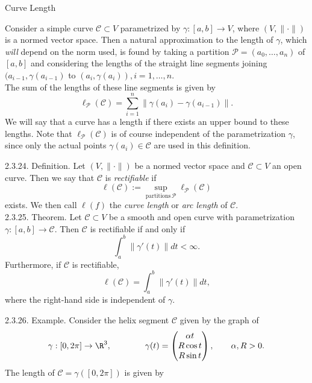 \documentclass[smaller,hyperref={CJKbookmarks=true}]{beamer}
\begin{document}
\begin{frame}{Curve Length}
\begin{spacing}{1.1}
Consider a simple curve $\mathcal{C}\subset V$ parametrized by $\gamma:[a,b]\to V$, where $(V,\|\cdot\|)$ is a normed vector space. Then a natural approximation to the length of $\gamma$, which \emph{will} depend on the norm used, is found by taking a partition $\mathcal{P}=(a_0,\ldots,a_n)$ of $[a,b]$ and considering the lengths of the straight line segments joining $(a_{i-1},\gamma(a_{i-1})$ to $(a_i,\gamma(a_i)),i=1,\ldots,n$.\\[4pt]
The sum of the lengths of these line segments is given by
\[\ell_\mathcal{P}(\mathcal{C})=\sum_{i=1}^{n}
\|\gamma(a_i)-\gamma(a_{i-1})\|.\]
We will say that a curve has a length if there exists an upper bound to
these lengths. Note that $\ell_\mathcal{P}(\mathcal{C})$ is of course independent of the parametrization $\gamma$, since only the actual points $\gamma(a_i)\in\mathcal{C}$ are used in this definition.
\end{spacing}
\newpage
\begin{spacing}{0.85}
\alert{2.3.24. Definition.} Let $(V,\|\cdot\|)$ be a normed vector space and $\mathcal{C}\subset V$ an open curve. Then we say that $\mathcal{C}$ is \emph{rectifiable} if
\[\ell(\mathcal{C}):=\sup\limits_{\text{partitions}\,\mathcal{P}}\ell_\mathcal{P}(\mathcal{C})\]
exists. We then call $\ell(f)$ the \emph{curve length} or \emph{arc length} of $\mathcal{C}$.\\[4pt]
\alert{2.3.25. Theorem.} Let $\mathcal{C}\subset V$ be a smooth and open curve with parametrization $\gamma:[a,b]\to\mathcal{C}$. Then $\mathcal{C}$ is rectifiable if and only if
\[\int_{a}^{b}\|\gamma'(t)\|dt<\infty.\]
Furthermore, if $\mathcal{C}$ is rectifiable,
\[\ell(\mathcal{C})=\int_{a}^{b}\|\gamma'(t)\|dt,\]
where the right-hand side is independent of $\gamma$.
\end{spacing}
\newpage
\begin{spacing}{1.05}
\alert{2.3.26. Example.} Consider the helix segment $\mathcal{C}$ given by the graph of
\[\gamma:[0,2\pi]\to\R^3,\qquad\qquad
\gamma(t)=\begin{pmatrix}
            \alpha t \\
            R\cos t \\
            R\sin t
          \end{pmatrix},\qquad\alpha,R>0.\]
The length of $\mathcal{C}=\gamma([0,2\pi])$ is given by
\begin{equation*}

\end{equation*}
\end{spacing}
\end{frame}
\end{document}
